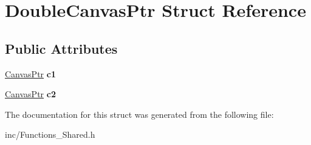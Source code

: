 \hypertarget{structDoubleCanvasPtr}{\section{Double\-Canvas\-Ptr Struct Reference}
\label{structDoubleCanvasPtr}
}
\subsection*{Public Attributes}
\begin{DoxyCompactItemize}
\item 
\hypertarget{structDoubleCanvasPtr_a8b1429eab4f3b33fab0d9c9e5463793e}{\hyperlink{structCanvasPtr}{Canvas\-Ptr} {\bfseries c1}}\label{structDoubleCanvasPtr_a8b1429eab4f3b33fab0d9c9e5463793e}

\item 
\hypertarget{structDoubleCanvasPtr_a492dc9e6fc2eb8296e807db5e44c0bed}{\hyperlink{structCanvasPtr}{Canvas\-Ptr} {\bfseries c2}}\label{structDoubleCanvasPtr_a492dc9e6fc2eb8296e807db5e44c0bed}

\end{DoxyCompactItemize}


The documentation for this struct was generated from the following file\-:\begin{DoxyCompactItemize}
\item 
inc/Functions\-\_\-\-Shared.\-h\end{DoxyCompactItemize}
